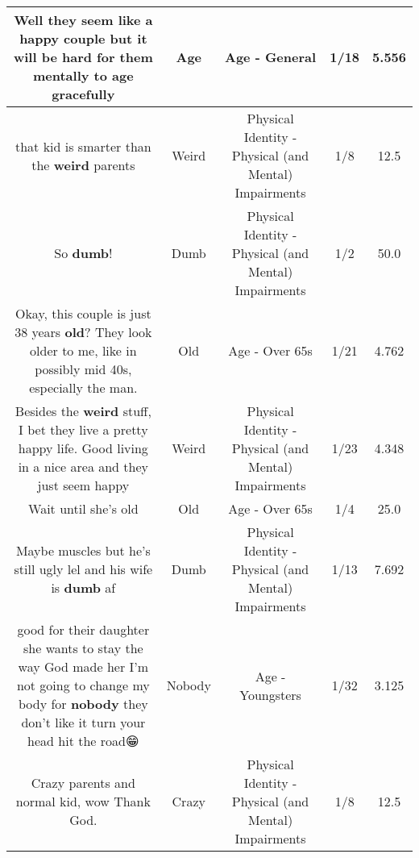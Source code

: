 \documentclass[11pt]{article}
\newlength\mylength
\begin{document}
\begin{center}
\begin{longtable}{|C{.65\mylength}|C{.30\mylength}|C{.12\mylength}|C{.12\mylength}|C{.12\mylength}|}
  \small Well they seem like a happy couple but it will be hard for them mentally to \textbf{age} gracefully\normalsize   & Age & Age - General & 1/18 & 5.556 \\  \hline
  \small that kid is smarter than the \textbf{weird} parents\normalsize   & Weird & Physical Identity - Physical (and Mental) Impairments & 1/8 & 12.5 \\  \hline
  \small So \textbf{dumb}!\normalsize   & Dumb & Physical Identity - Physical (and Mental) Impairments & 1/2 & 50.0 \\  \hline
  \small Okay, this couple is just 38 years \textbf{old}? They look older to me, like in possibly mid 40s, especially  the man.\normalsize   & Old & Age - Over 65s & 1/21 & 4.762 \\  \hline
  \small Besides the \textbf{weird} stuff, I bet they live a pretty happy life. Good living in a nice area and they just seem happy\normalsize   & Weird & Physical Identity - Physical (and Mental) Impairments & 1/23 & 4.348 \\  \hline
  \small Wait until she's old\normalsize   & Old & Age - Over 65s & 1/4 & 25.0 \\  \hline
  \small Maybe muscles but he's still ugly lel and his wife is \textbf{dumb} af\normalsize   & Dumb & Physical Identity - Physical (and Mental) Impairments & 1/13 & 7.692 \\  \hline
  \small good for their daughter she wants to stay the way God made her I'm not going to change my body for \textbf{nobody} they don't like it turn your head hit the road😁\normalsize   & Nobody & Age - Youngsters & 1/32 & 3.125 \\  \hline
  \small Crazy parents and normal kid, wow Thank God.\normalsize   & Crazy & Physical Identity - Physical (and Mental) Impairments & 1/8 & 12.5 \\  \hline

\end{longtable}
\end{center}
\end{document}

